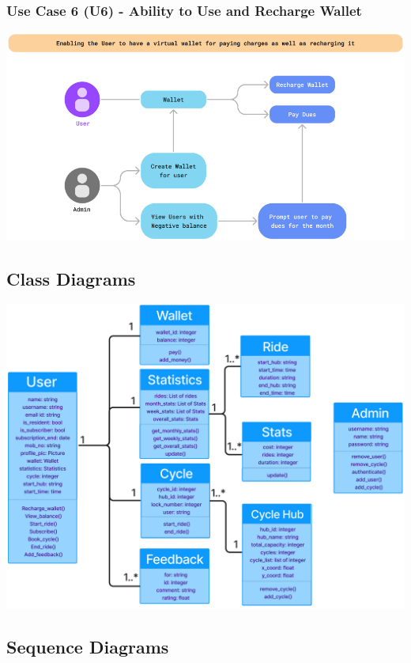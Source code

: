\documentclass[11pt]{article}
\begin{document}
\subsubsection{Use Case 6 (U6) - Ability to Use and Recharge Wallet}
\begin{center}
  \includegraphics[scale=0.5]{../srs/usecase-6.png}
\end{center}

\subsection{Class Diagrams}
\begin{center}
  \includegraphics[scale=0.1]{class-diagram-images/overall.jpg}
\end{center}

\subsection{Sequence Diagrams}
\end{document}
